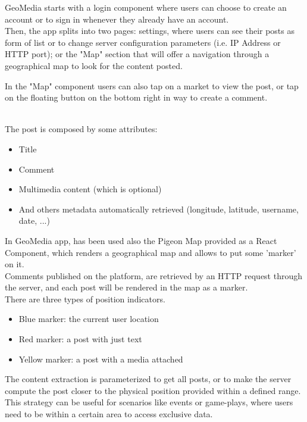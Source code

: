 \documentclass[conference]{IEEEtran}
\begin{document}
GeoMedia starts with a login component where users can choose to create an account or to sign in whenever they already have an account.
\\
Then, the app splits into two pages: settings, where users can see their posts as form of list or to change server configuration parameters (i.e. IP Address or HTTP port); or the "Map" section that will offer a navigation through a geographical map to look for the content posted.


In the "Map" component users can also tap on a market to view the post, or tap on the floating button on the bottom right in way to create a comment.


\\The post is composed by some attributes:
\begin{itemize}
    \item Title
    \item Comment
    \item Multimedia content (which is optional)
    \item And others metadata automatically retrieved (longitude, latitude, username, date, ...)
\end{itemize}

In GeoMedia app, has been used also the Pigeon Map\cite{b8} provided as a React Component, which renders a geographical map and allows to put some 'marker' on it.
\\
Comments published on the platform, are retrieved by an HTTP request through the server, and each post will be rendered in the map as a marker.
\\There are three types of position indicators.
\begin{itemize}
\item Blue marker: the current user location
\item Red marker: a post with just text
\item Yellow marker: a post with a media attached 
\end{itemize}

The content extraction is parameterized to get all posts, or to make the server compute the post closer to the physical position provided within a defined range.
This strategy can be useful for scenarios like events or game-plays, where users need to be  within a certain area to access exclusive data.
\end{document}
